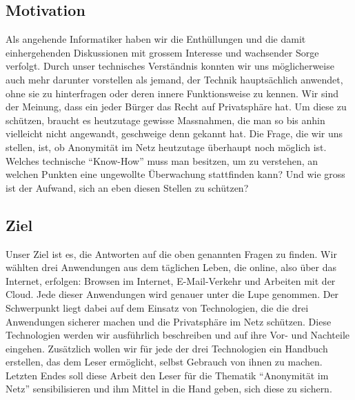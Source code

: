 \subsection{Motivation}
Als angehende Informatiker haben wir die Enthüllungen und die damit einhergehenden Diskussionen mit grossem Interesse und wachsender Sorge verfolgt. Durch unser technisches Verständnis konnten wir uns möglicherweise auch mehr darunter vorstellen als jemand, der Technik hauptsächlich anwendet, ohne sie zu hinterfragen oder deren innere Funktionsweise zu kennen. Wir sind der Meinung, dass ein jeder Bürger das Recht auf Privatsphäre hat. Um diese zu schützen, braucht es heutzutage gewisse Massnahmen, die man so bis anhin vielleicht nicht angewandt, geschweige denn gekannt hat. Die Frage, die wir uns stellen, ist, ob Anonymität im Netz heutzutage überhaupt noch möglich ist. Welches technische ``Know-How'' muss man besitzen, um zu verstehen, an welchen Punkten eine ungewollte Überwachung stattfinden kann? Und wie gross ist der Aufwand, sich an eben diesen Stellen zu schützen?

\subsection{Ziel}
Unser Ziel ist es, die Antworten auf die oben genannten Fragen zu finden. Wir wählten drei Anwendungen aus dem täglichen Leben, die online, also über das Internet, erfolgen: Browsen im Internet, E-Mail-Verkehr und Arbeiten mit der Cloud. Jede dieser Anwendungen wird genauer unter die Lupe genommen. Der Schwerpunkt liegt dabei auf dem Einsatz von Technologien, die die drei Anwendungen sicherer machen und die Privatsphäre im Netz schützen. Diese Technologien werden wir ausführlich beschreiben und auf ihre Vor- und Nachteile eingehen. Zusätzlich wollen wir für jede der drei Technologien ein Handbuch erstellen, das dem Leser ermöglicht, selbst Gebrauch von ihnen zu machen. Letzten Endes soll diese Arbeit den Leser für die Thematik ``Anonymität im Netz'' sensibilisieren und ihm Mittel in die Hand geben, sich diese zu sichern.
